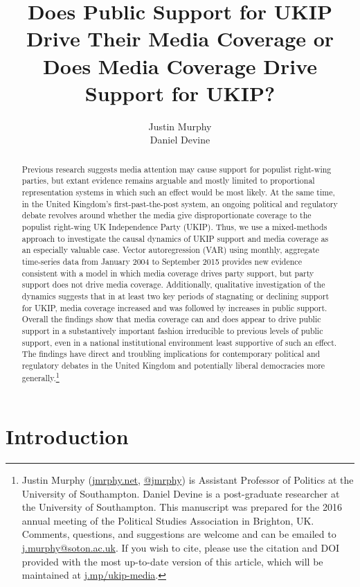 \documentclass[12pt,article]{article}
\title{Does Public Support for UKIP Drive Their Media Coverage or Does Media
Coverage Drive Support for UKIP?}
\author{Justin Murphy \\ Daniel Devine}
\date{}
\let\rmarkdownfootnote\footnote%
\def\footnote{\protect\rmarkdownfootnote}
\begin{document}
\maketitle

\begin{abstract}
Previous research suggests media attention may cause support for populist right-wing parties, but extant evidence remains arguable and mostly limited to proportional representation systems in which such an effect would be most likely. At the same time, in the United Kingdom's first-past-the-post system, an ongoing political and regulatory debate revolves around whether the media give disproportionate coverage to the populist right-wing UK Independence Party (UKIP). Thus, we use a mixed-methods approach to investigate the causal dynamics of UKIP support and media coverage as an especially valuable case. Vector autoregression (VAR) using monthly, aggregate time-series data from January 2004 to September 2015 provides new evidence consistent with a model in which media coverage drives party support, but party support does not drive media coverage. Additionally, qualitative investigation of the dynamics suggests that in at least two key periods of stagnating or declining support for UKIP, media coverage increased and was followed by increases in public support. Overall the findings show that media coverage can and does appear to drive public support in a substantively important fashion irreducible to previous levels of public support, even in a national institutional environment least supportive of such an effect. The findings have direct and troubling implications for contemporary political and regulatory debates in the United Kingdom and potentially liberal democracies more generally.\footnote{Justin Murphy (\href{http://jmrphy.net}{jmrphy.net}, \href{http://twitter.com/jmrphy}{@jmrphy}) is Assistant Professor of Politics at the University of Southampton. Daniel Devine is a post-graduate researcher at the University of Southampton. This manuscript was prepared for the 2016 annual meeting of the Political Studies Association in Brighton, UK. Comments, questions, and suggestions are welcome and can be emailed to \href{mailto:j.murphy@soton.ac.uk}{j.murphy@soton.ac.uk}. If you wish to cite, please use the citation and DOI provided with the most up-to-date version of this article, which will be maintained at \href{http://j.mp/ukip-media}{j.mp/ukip-media}.}
\end{abstract}
\doublespacing
\setlength\parindent{24pt}

\section{Introduction}\label{introduction}
\end{document}
